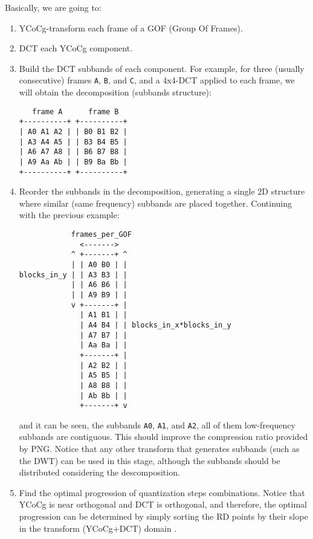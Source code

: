 Basically, we are going to:
\begin{enumerate}
\item YCoCg-transform each frame of a GOF (Group Of Frames).
\item DCT each YCoCg component.
\item Build the DCT subbands of each component. For example, for three
  (usually consecutive) frames \verb|A|, \verb|B|, and \verb|C|, and a
  4x4-DCT applied to each frame, we will obtain the decomposition
  (subbands structure):
\begin{verbatim}
   frame A      frame B
+----------+ +----------+
| A0 A1 A2 | | B0 B1 B2 |
| A3 A4 A5 | | B3 B4 B5 |
| A6 A7 A8 | | B6 B7 B8 |
| A9 Aa Ab | | B9 Ba Bb |
+----------+ +----------+
\end{verbatim}

\item Reorder the subbands in the decomposition, generating a single
  2D structure where similar (same frequency) subbands are placed
  together. Continuing with the previous example:
\begin{verbatim}
            frames_per_GOF
              <------->
            ^ +-------+ ^
            | | A0 B0 | |
blocks_in_y | | A3 B3 | |
            | | A6 B6 | |
            | | A9 B9 | |
            v +-------+ |
              | A1 B1 | |
              | A4 B4 | | blocks_in_x*blocks_in_y
              | A7 B7 | |
              | Aa Ba | |
              +-------+ |
              | A2 B2 | |
              | A5 B5 | |
              | A8 B8 | |
              | Ab Bb | |
              +-------+ v
\end{verbatim}
  and it can be seen, the subbands \verb|A0|, \verb|A1|, and
  \verb|A2|, all of them low-frequency subbands are contiguous. This
  should improve the compression ratio provided by PNG.  Notice that
  any other transform that generates subbands (such as the DWT) can be
  used in this stage, although the subbands should be distributed
  considering the descomposition.

\item Find the optimal progression of quantization steps
  combinations. Notice that YCoCg is near orthogonal and DCT is
  orthogonal, and therefore, the optimal progression can be determined
  by simply sorting the RD points by their slope in the transform
  (YCoCg+DCT) domain .


\end{enumerate}
